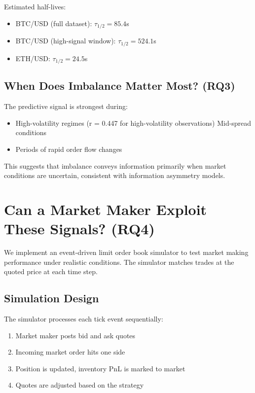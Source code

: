 \documentclass[12pt,a4paper]{article}
\begin{document}
Estimated half-lives:
\begin{itemize}
    \item BTC/USD (full dataset): $\tau_{1/2} = 85.4$s
    \item BTC/USD (high-signal window): $\tau_{1/2} = 524.1$s
    \item ETH/USD: $\tau_{1/2} = 24.5$s
\end{itemize}

\subsection{When Does Imbalance Matter Most? (RQ3)}

The predictive signal is strongest during:
\begin{itemize}
    \item High-volatility regimes (r = 0.447 for high-volatility observations)
    \times Mid-spread conditions
    \item Periods of rapid order flow changes
\end{itemize}

This suggests that imbalance conveys information primarily when market conditions are uncertain, consistent with information asymmetry models.

\section{Can a Market Maker Exploit These Signals? (RQ4)}

We implement an event-driven limit order book simulator to test market making performance under realistic conditions. The simulator matches trades at the quoted price at each time step.

\subsection{Simulation Design}

The simulator processes each tick event sequentially:
\begin{enumerate}
    \item Market maker posts bid and ask quotes
    \item Incoming market order hits one side
    \item Position is updated, inventory PnL is marked to market
    \item Quotes are adjusted based on the strategy
\end{enumerate}
\end{document}
